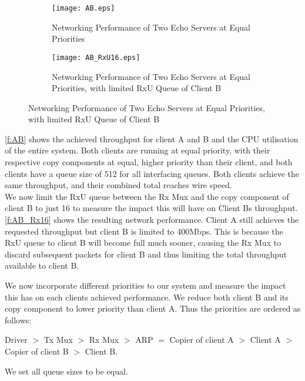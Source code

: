 \noindent\begin{figure}[h]
    \centering
	\begin{multicols}{2}
		\begin{subfigure}[b]{0.45\textwidth}
        \centering
        \texttt{[image: AB.eps]}
        \caption{Networking Performance of Two Echo Servers at Equal Priorities}
        \label{f:AB}
    \end{subfigure}\qquad
    \begin{subfigure}[b]{0.45\textwidth}
        \centering
        \texttt{[image: AB\_RxU16.eps]}
        \caption{Networking Performance of Two Echo Servers at Equal Priorities, with limited RxU Queue of Client B}
        \label{f:AB_Rx16}
    \end{subfigure}
\end{multicols}
\end{figure}

\autoref{f:AB} shows the achieved throughput for client A and B and the CPU utilisation of the entire system. 
Both clients are running at equal priority, with their respective copy components at equal, higher priority than their
client, and both clients have a queue size of 512 for all interfacing queues. Both clients achieve the same 
throughput, and their combined total reaches wire speed.\\

We now limit the RxU queue between the Rx Mux and the copy component of client B to just 16 to measure 
the impact this will have on Client Bs throughput. \autoref{f:AB_Rx16} shows the resulting network performance.
Client A still achieves the requested throughput but client B is limited to 400Mbps. This is because the RxU queue
to client B will become full much sooner, causing the Rx Mux to discard subsequent packets for client B and thus
limiting the total throughput available to client B. 

We now incorporate different priorities to our system and measure the impact this has on each clients
achieved performance. We reduce both client B and its copy component to lower priority than client A. 
Thus the priorities are ordered as follows:\\ 

\centerline{Driver \(>\) Tx Mux  \(>\) Rx Mux \(>\) ARP \(=\) Copier of client A \(>\) Client A \(>\) Copier of client B \(>\) Client B.}

We set all queue sizes to be equal. 

